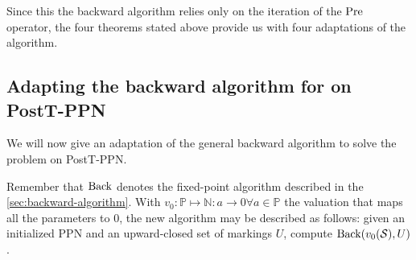 %
%
%

Since this the backward algorithm relies only on the iteration of the $\operatorname{Pre}$ operator, the four theorems stated above provide us with four adaptations of the algorithm.

\subsection{Adapting the backward algorithm for \Ucov on PostT-\ac{PPN}}

We will now give an adaptation of the general backward algorithm to solve the \Ucov problem on PostT-\ac{PPN}.

Remember that $\operatorname{Back}$ denotes the fixed-point algorithm described in the \autoref{sec:backward-algorithm}.
With $v_0 : \mathbb{P} \mapsto \mathbb{N} : a \rightarrow 0 \forall a \in \mathbb{P}$ the valuation that maps all the parameters to 0, the new algorithm may be described as follows:
given an initialized \ac{PPN} \SPTPm and an upward-closed set of markings $U$, compute $\operatorname{Back}(v_0(\mathcal{S}), U)$.

